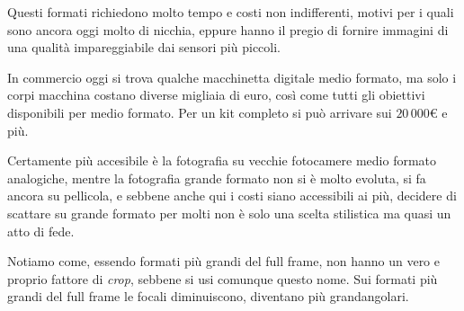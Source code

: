 Questi formati richiedono molto tempo e costi non indifferenti, motivi per i quali sono ancora oggi molto di nicchia, eppure hanno il pregio di fornire immagini di una qualità impareggiabile dai sensori più piccoli.

In commercio oggi si trova qualche macchinetta digitale medio formato, ma solo i corpi macchina costano diverse migliaia di euro, così come tutti gli obiettivi disponibili per medio formato. Per un kit completo si può arrivare sui $20\,000 \euro{}$ e più.

Certamente più accesibile è la fotografia su vecchie fotocamere medio formato analogiche, mentre la fotografia grande formato non si è molto evoluta, si fa ancora su pellicola, e sebbene anche qui i costi siano accessibili ai più, decidere di scattare su grande formato per molti non è solo una scelta stilistica ma quasi un atto di fede.

Notiamo come, essendo formati più grandi del full frame, non hanno un vero e proprio fattore di \textit{crop}, sebbene si usi comunque questo nome. Sui formati più grandi del full frame le focali diminuiscono, diventano più grandangolari.